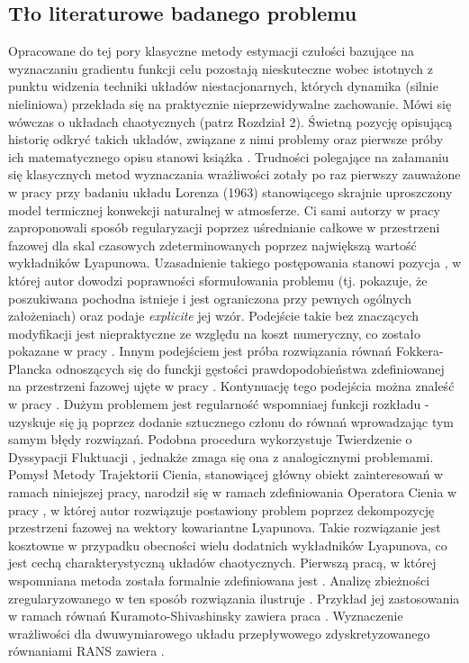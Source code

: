 \documentclass[12pt]{article}
\begin{document}
\subsection{Tło literaturowe badanego problemu}
Opracowane do tej pory klasyczne metody estymacji czułości bazujące na wyznaczaniu gradientu funkcji celu pozostają nieskuteczne wobec istotnych z punktu widzenia techniki układów niestacjonarnych, których dynamika (silnie nieliniowa) przekłada się na praktycznie nieprzewidywalne zachowanie. Mówi się wówczas o układach chaotycznych (patrz Rozdział 2). Świetną pozycję opisującą historię odkryć takich układów, związane z nimi problemy oraz pierwsze próby ich matematycznego opisu stanowi książka \cite{Gleick}. Trudności polegające na załamaniu się klasycznych metod wyznaczania wrażliwości zotały po raz pierwszy zauważone w pracy \cite{Lea1} przy badaniu układu Lorenza (1963) stanowiącego skrajnie uproszczony model termicznej konwekcji naturalnej w atmosferze. Ci sami autorzy w pracy \cite{Lea2} zaproponowali sposób regularyzacji poprzez uśrednianie całkowe w przestrzeni fazowej dla skal czasowych zdeterminowanych poprzez największą wartość wykładników Lyapunowa. Uzasadnienie takiego postępowania stanowi pozycja \cite{Ruelle1}, w której autor dowodzi poprawności sformułowania problemu (tj. pokazuje, że poszukiwana pochodna istnieje i jest ograniczona przy pewnych ogólnych założeniach) oraz podaje \textit{explicite} jej wzór. Podejście takie bez znaczących modyfikacji jest niepraktyczne ze względu na koszt numeryczny, co zostało pokazane w pracy \cite{Chandramoorthy}.\newline
Innym podejściem jest próba rozwiązania równań Fokkera-Plancka odnoszących się do funckji gęstości prawdopodobieństwa zdefiniowanej na przestrzeni fazowej ujęte w pracy \cite{Thuburn}. Kontynuację tego podejścia można znaleść w pracy \cite{Blonigan1}. Dużym problemem jest regularność wspomniaej funkcji rozkładu - uzyskuje się ją poprzez dodanie sztucznego członu do równań wprowadzając tym samym błędy rozwiązań. Podobna procedura wykorzystuje Twierdzenie o Dyssypacji Fluktuacji \cite{Abramov}, jednakże zmaga się ona z analogicznymi problemami.\newline
Pomysł Metody Trajektorii Cienia, stanowiącej główny obiekt zainteresowań w ramach niniejszej pracy, narodził się w ramach zdefiniowania Operatora Cienia w pracy \cite{Qiqi1}, w której autor rozwiązuje postawiony problem poprzez dekompozycję przestrzeni fazowej na wektory kowariantne Lyapunova. Takie rozwiązanie jest kosztowne w przypadku obecności wielu dodatnich wykładników Lyapunova, co jest cechą charakterystyczną układów chaotycznych. Pierwszą pracą, w której wspomniana metoda została formalnie zdefiniowana jest \cite{Qiqi3}. Analizę zbieżności zregularyzowanego w ten sposób rozwiązania ilustruje \cite{Qiqi2}. Przykład jej zastosowania w ramach równań Kuramoto-Shivashinsky zawiera praca \cite{Blonigan3}. Wyznaczenie wrażliwości dla dwuwymiarowego układu przepływowego zdyskretyzowanego równaniami RANS zawiera \cite{Blonigan2}. \newline
\end{document}
